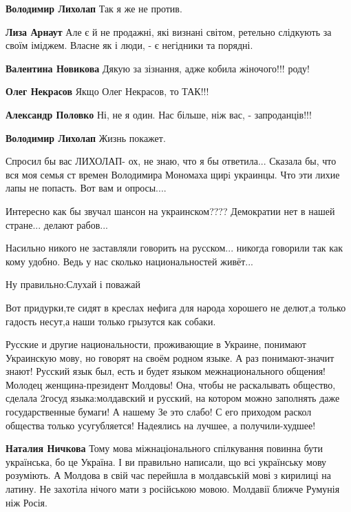 \begin{itemize}
{\begin{itemize}
\textbf{Володимир Лихолап} Так я же не против.

\textbf{Лиза Арнаут} Але є й не продажні, які визнані світом, ретельно слідкують за своїм іміджем. Власне як і люди, - є негідники та порядні.

\textbf{Валентина Новикова} Дякую за зізнання, адже кобила жіночого!!! роду!

\textbf{Олег Некрасов} Якщо Олег Некрасов, то ТАК!!!

\textbf{Александр Половко} Ні, не я один. Нас більше, ніж вас, - запроданців!!!

\textbf{Володимир Лихолап} Жизнь покажет.

Спросил бы вас ЛИХОЛАП- ох, не знаю, что я бы ответила... Сказала бы, что вся моя семья ст времен Володимира Мономаха щирi украинцы. Что эти лихие лапы не попасть. Вот вам и опросы....


\end{itemize}


Интересно как бы звучал шансон на украинском???? Демократии нет в нашей
стране... делают рабов...


Насильно никого не заставляли говорить на русском... никогда говорили так как
кому удобно. Ведь у нас сколько национальностей живёт...

Ну правильно:Слухай і поважай

Вот придурки,те сидят в креслах нефига для народа хорошего не делют,а только гадость несут,а наши только грызутся как собаки.


Русские и другие национальности, проживающие в Украине, понимают Украинскую
мову, но говорят на своём родном языке. А раз понимают-значит знают! Русский
язык был, есть и будет языком межнационального общения! Молодец
женщина-президент Молдовы! Она, чтобы не раскалывать общество, сделала 2госуд
языка:молдавский и русский, на котором можно заполнять даже государственные
бумаги! А нашему Зе это слабо! С его приходом раскол общества только
усугубляется! Надеялись на лучшее, а получили-худшее!

\begin{itemize}
\textbf{Наталия Ничкова} Тому мова міжнаціонального спілкування повинна бути
українська, бо це Україна. І ви правильно написали, що всі українську мову
розуміють. А Молдова в свій час перейшла в молдавській мові з кирилиці на
латину. Не захотіла нічого мати з російською мовою. Молдавії ближче Румунія ніж
Росія.


\end{itemize}}
\end{itemize}
